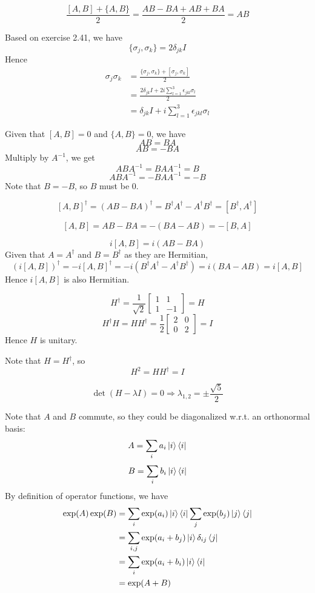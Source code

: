 \documentclass{homeworg}
\begin{document}
\exercise*

\exercise*
\[\frac{[A,B]+\{A,B\}}{2}=\frac{AB-BA+AB+BA}{2}=AB\]

\exercise*
Based on exercise 2.41, we have
\[\{\sigma_j,\sigma_k\}=2\delta_{jk}I\]
Hence
\begin{align}
    \sigma_j\sigma_k&=\frac{\{\sigma_j,\sigma_k\}+[\sigma_j,\sigma_k]}{2}\nonumber\\
    &=\frac{2\delta_{jk}I+2i\sum_{l=1}^3\epsilon_{jkl}\sigma_l}{2}\nonumber\\
    &=\delta_{jk}I+i\sum_{l=1}^3\epsilon_{jkl}\sigma_l\nonumber
\end{align}

\exercise*
Given that $[A,B]=0$ and $\{A,B\}=0$, we have
\[AB=BA\]
\[AB=-BA\]
Multiply by $A^{-1}$, we get
\[ABA^{-1}=BAA^{-1}=B\]
\[ABA^{-1}=-BAA^{-1}=-B\]
Note that $B=-B$, so $B$ must be 0.

\exercise*
\[[A,B]^\dagger=(AB-BA)^\dagger=B^\dagger A^\dagger-A^\dagger B^\dagger=[B^\dagger,A^\dagger]\]

\exercise*
\[[A,B]=AB-BA=-(BA-AB)=-[B,A]\]

\exercise*
\[i[A,B]=i(AB-BA)\]
Given that $A=A^\dagger$ and $B=B^\dagger$ as they are Hermitian,
\[(i[A,B])^\dagger=-i[A,B]^\dagger=-i(B^\dagger A^\dagger-A^\dagger B^\dagger)=i(B A-A B)=i[A,B]\]
Hence $i[A,B]$ is also Hermitian.

\exercise*

\exercise*

\exercise*

\exercise*
\[H^\dagger=\frac{1}{\sqrt{2}}
\begin{bmatrix}
1&1\\
1&-1
\end{bmatrix}
=H
\]
\[H^\dagger H=H H^\dagger=\frac{1}{2}
\begin{bmatrix}
2&0\\
0&2
\end{bmatrix}=I\]
Hence $H$ is unitary.

\exercise*
Note that $H=H^\dagger$, so
\[H^2=H H^\dagger=I\]

\exercise*
\[\det(H-\lambda I)=0\Rightarrow \lambda_{1,2}=\pm\frac{\sqrt{5}}{2}\]

\exercise*
Note that $A$ and $B$ commute, so they could be diagonalized w.r.t. an orthonormal basis:
\[A=\sum_{i}a_{i}\ket{i}\bra{i}\]
\[B=\sum_{i}b_{i}\ket{i}\bra{i}\]
By definition of operator functions, we have
\begin{align}
    \exp(A)\exp(B)&=\sum_{i}\exp(a_{i})\ket{i}\bra{i}\sum_{j}\exp(b_{j})\ket{j}\bra{j}\nonumber\\
    &=\sum_{i,j}\exp(a_{i}+b_{j})\ket{i}\delta_{ij}\bra{j}\nonumber\\
    &=\sum_i \exp(a_{i}+b_{i})\ket{i}\bra{i}\nonumber\\
    &=\exp(A+B)\nonumber
\end{align}
\end{document}
